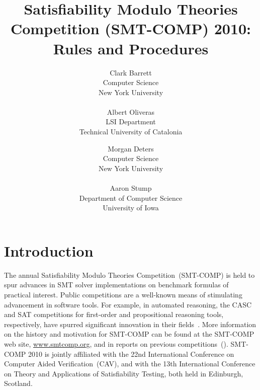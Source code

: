 \documentclass[12pt]{article}
\begin{document}
\date{}

\title{Satisfiability Modulo Theories Competition (SMT-COMP) 2010: Rules and 
Procedures}

\def\doauthor#1{{%
  \hsize.5\hsize \advance\hsize by-1cm %
  \def\\{\hss\egroup\hbox to\hsize\bgroup\strut\hss}%
  \vbox{\hbox to\hsize\bgroup\strut\hss#1\hss\egroup}}}%

\def\header#1{\medskip\noindent\textbf{#1}}

\author{
Clark Barrett\\
Computer Science\\
New York University\\
\\
Albert Oliveras \\
LSI Department \\
Technical University of Catalonia \\
\and
Morgan Deters \\
Computer Science \\
New York University \\
\\
Aaron Stump \\
Department of Computer Science \\
University of Iowa}

\maketitle

\def\eg{\textit{e.g.}}
\def\ie{\textit{i.e.}}

\section{Introduction}
\label{sec:intro}

The annual Satisfiability Modulo Theories Competition~(SMT-COMP) is
held to spur advances in SMT solver implementations on benchmark
formulas of practical interest.  Public competitions are a well-known
means of stimulating advancement in software tools.  For example, in
automated reasoning, the CASC and SAT competitions for first-order and
propositional reasoning tools, respectively, have spurred significant
innovation in their fields~\cite{PSS02,leberre+03}.  More information
on the history and motivation for SMT-COMP can be found at the
SMT-COMP web site, \url{www.smtcomp.org}, and in reports on previous
competitions~(\cite{SMTCOMP-2008,BDOS08,SMTCOMP-FMSD,SMTCOMP-JAR}).
SMT-COMP 2010 is jointly affiliated with the 22nd International
Conference on Computer Aided Verification~(CAV), and with the 13th
International Conference on Theory and Applications of Satisfiability
Testing, both held in Edinburgh, Scotland.
\end{document}
